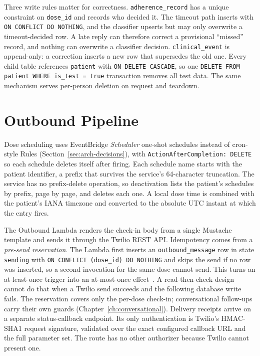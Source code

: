 Three write rules matter for correctness. \texttt{adherence\_record} has a unique constraint on
\texttt{dose\_id} and records who decided it. The timeout path inserts with
\texttt{ON CONFLICT DO NOTHING}, and the classifier upserts but may only
overwrite a timeout-decided row. A late reply can therefore correct a
provisional ``missed'' record, and nothing can overwrite a classifier decision.
\texttt{clinical\_event} is append-only: a correction inserts a new row that
supersedes the old one. Every child table references \texttt{patient} with
\texttt{ON DELETE CASCADE}, so one
\texttt{DELETE FROM patient WHERE is\_test = true} transaction removes all test
data. The same mechanism serves per-person deletion on request and teardown.

\section{Outbound Pipeline}
\label{sec:arch-outbound}

Dose scheduling uses EventBridge \emph{Scheduler} one-shot schedules instead of
cron-style Rules (Section~\ref{sec:arch-decisions}), with
\texttt{ActionAfterCompletion: DELETE} so each schedule deletes itself after
firing. Each schedule name starts with the patient identifier, a prefix that
survives the service's 64-character truncation. The service has no
prefix-delete operation, so deactivation lists the patient's schedules by
prefix, page by page, and deletes each one. A local dose time is combined with
the patient's IANA timezone and converted to the absolute UTC instant at which
the entry fires.

The Outbound Lambda renders the check-in body from a single Mustache template
and sends it through the Twilio REST API. Idempotency comes from a
\emph{pre-send reservation}. The Lambda first inserts an
\texttt{outbound\_message} row in state \texttt{sending} with
\texttt{ON CONFLICT (dose\_id) DO NOTHING} and skips the send if no row was
inserted, so a second invocation for the same dose cannot send. This turns an
at-least-once trigger into an at-most-once effect~\cite{helland2012idempotence}.
A read-then-check design cannot do that when a Twilio send succeeds and the
following database write fails. The reservation covers only the per-dose
check-in; conversational follow-ups carry their own guards
(Chapter~\ref{ch:conversational}). Delivery receipts arrive on a separate
status-callback endpoint. Its only authentication is Twilio's HMAC-SHA1 request
signature, validated over the exact configured callback URL and the full
parameter set. The route has no other authorizer because Twilio cannot present
one.

